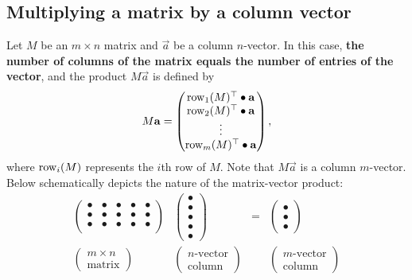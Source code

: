 \documentclass{ximera}
\begin{document}
\subsection{Multiplying a matrix by a column vector}
Let $M$ be an $m\times n$ matrix and $\vec{a}$ be a column $n$-vector. In
this case, \textbf{the number of columns of the matrix equals the
  number of entries of the vector}, and the product $M\vec{a}$ is
defined by
\[
  M \mathbf{a} =
  \begin{pmatrix}
    \operatorname{row}_1(M)^\top \bullet \mathbf{a} \\
    \operatorname{row}_2(M)^\top \bullet \mathbf{a} \\
    \vdots \\
    \operatorname{row}_m(M)^\top \bullet \mathbf{a}
  \end{pmatrix},
\]
where $\operatorname{row}_i(M)$ represents the $i$th row of $M$. Note that
$M\vec{a}$ is a column $m$-vector. Below schematically depicts the
nature of the matrix-vector product:
\[
  \begin{matrix}
    \begin{pmatrix}
      \bullet & \bullet & \bullet & \bullet & \bullet \\
      \bullet & \bullet & \bullet & \bullet & \bullet \\
      \bullet & \bullet & \bullet & \bullet & \bullet \\
    \end{pmatrix}
    &
      \begin{pmatrix}
        \bullet \\ \bullet \\ \bullet \\ \bullet \\ \bullet
      \end{pmatrix}
    & = &
          \begin{pmatrix}
            \bullet \\ \bullet \\ \bullet
          \end{pmatrix}
    \\
    \begin{pmatrix}
      m\times n\\
      \text{matrix}
    \end{pmatrix}
    &
      \begin{pmatrix}
        n\text{-vector}\\
        \text{column}
      \end{pmatrix}
    & &
        \begin{pmatrix}
          m\text{-vector}\\
          \text{column}
        \end{pmatrix}
  \end{matrix}
\]
\end{document}
